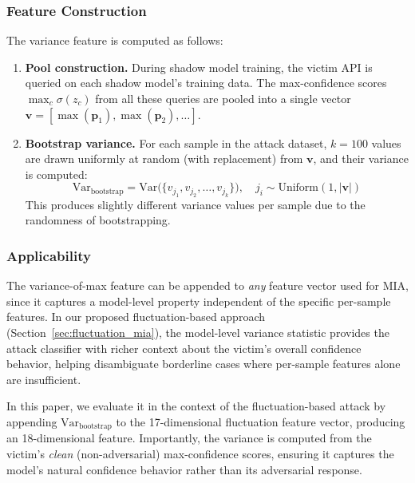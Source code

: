 \documentclass[conference]{IEEEtran}
\begin{document}
\subsubsection{Feature Construction}

The variance feature is computed as follows:

\begin{enumerate}[leftmargin=*]
    \item \textbf{Pool construction.} During shadow model training, the victim API is queried on each shadow model's training data. The max-confidence scores $\max_c \sigma(z_c)$ from all these queries are pooled into a single vector $\mathbf{v} = [\max(\mathbf{p}_1), \max(\mathbf{p}_2), \ldots]$.
    
    \item \textbf{Bootstrap variance.} For each sample in the attack dataset, $k = 100$ values are drawn uniformly at random (with replacement) from $\mathbf{v}$, and their variance is computed:
    \begin{equation}
        \text{Var}_{\text{bootstrap}} = \text{Var}\big(\{v_{j_1}, v_{j_2}, \ldots, v_{j_k}\}\big), \quad j_i \sim \text{Uniform}(1, |\mathbf{v}|)
    \end{equation}
    This produces slightly different variance values per sample due to the randomness of bootstrapping.
\end{enumerate}

\subsubsection{Applicability}

The variance-of-max feature can be appended to \textit{any} feature vector used for MIA, since it captures a model-level property independent of the specific per-sample features. In our proposed fluctuation-based approach (Section~\ref{sec:fluctuation_mia}), the model-level variance statistic provides the attack classifier with richer context about the victim's overall confidence behavior, helping disambiguate borderline cases where per-sample features alone are insufficient.

In this paper, we evaluate it in the context of the fluctuation-based attack by appending $\text{Var}_{\text{bootstrap}}$ to the 17-dimensional fluctuation feature vector, producing an 18-dimensional feature. Importantly, the variance is computed from the victim's \textit{clean} (non-adversarial) max-confidence scores, ensuring it captures the model's natural confidence behavior rather than its adversarial response.
\end{document}
